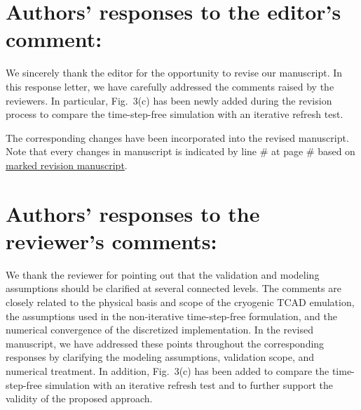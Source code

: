 \documentclass[11pt]{article}
\begin{document}
\section*{\normalsize{Authors' responses to the editor's comment:}}

We sincerely thank the editor for the opportunity to revise our manuscript.
In this response letter, we have carefully addressed the comments raised by the reviewers.
In particular, Fig.~3(c) has been newly added during the revision process to compare the time-step-free simulation with an iterative refresh test.

The corresponding changes have been incorporated into the revised manuscript.
Note that every changes in manuscript is indicated by line \# at page \# based on \uline{marked revision manuscript}.

\section*{\normalsize{Authors' responses to the reviewer's comments:}}

We thank the reviewer for pointing out that the validation and modeling assumptions should be clarified at several connected levels.
The comments are closely related to the physical basis and scope of the cryogenic TCAD emulation, the assumptions used in the non-iterative time-step-free formulation, and the numerical convergence of the discretized implementation.
In the revised manuscript, we have addressed these points throughout the corresponding responses by clarifying the modeling assumptions, validation scope, and numerical treatment. In addition, Fig.~3(c) has been added to compare the time-step-free simulation with an iterative refresh test and to further support the validity of the proposed approach.
\end{document}
